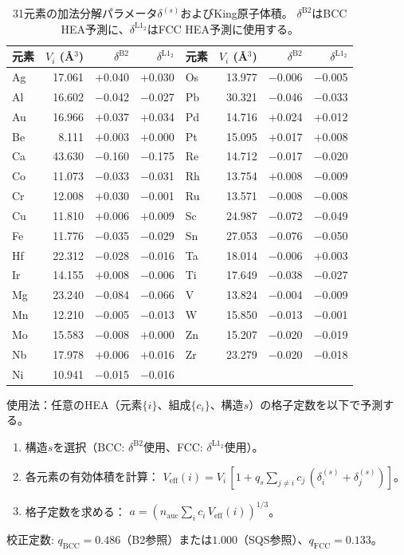 \documentclass[5p,10pt]{elsarticle}
\begin{document}
\begin{table}[!t]
\centering
\caption{31元素の加法分解パラメータ$\delta^{(s)}$およびKing原子体積。
$\delta^\text{B2}$はBCC HEA予測に、$\delta^{\text{L1}_2}$はFCC HEA予測に使用する。}
\label{tab:delta_params}
\footnotesize
\begin{tabular}{@{}lrrr|lrrr@{}}
\toprule
元素 & $V_i$ (\AA$^3$) & $\delta^\text{B2}$ & $\delta^{\text{L1}_2}$ &
元素 & $V_i$ (\AA$^3$) & $\delta^\text{B2}$ & $\delta^{\text{L1}_2}$ \\
\midrule
Ag &  17.061 & $+$0.040 & $+$0.030 & Os &  13.977 & $-$0.006 & $-$0.005 \\
Al &  16.602 & $-$0.042 & $-$0.027 & Pb &  30.321 & $-$0.046 & $-$0.033 \\
Au &  16.966 & $+$0.037 & $+$0.034 & Pd &  14.716 & $+$0.024 & $+$0.012 \\
Be &   8.111 & $+$0.003 & $+$0.000 & Pt &  15.095 & $+$0.017 & $+$0.008 \\
Ca &  43.630 & $-$0.160 & $-$0.175 & Re &  14.712 & $-$0.017 & $-$0.020 \\
Co &  11.073 & $-$0.033 & $-$0.031 & Rh &  13.754 & $+$0.008 & $-$0.009 \\
Cr &  12.008 & $+$0.030 & $-$0.001 & Ru &  13.571 & $-$0.008 & $-$0.008 \\
Cu &  11.810 & $+$0.006 & $+$0.009 & Sc &  24.987 & $-$0.072 & $-$0.049 \\
Fe &  11.776 & $-$0.035 & $-$0.029 & Sn &  27.053 & $-$0.076 & $-$0.050 \\
Hf &  22.312 & $-$0.028 & $-$0.016 & Ta &  18.014 & $-$0.006 & $+$0.003 \\
Ir &  14.155 & $+$0.008 & $-$0.006 & Ti &  17.649 & $-$0.038 & $-$0.027 \\
Mg &  23.240 & $-$0.084 & $-$0.066 & V  &  13.824 & $-$0.004 & $-$0.009 \\
Mn &  12.210 & $-$0.005 & $-$0.013 & W  &  15.850 & $-$0.013 & $-$0.001 \\
Mo &  15.583 & $-$0.008 & $+$0.000 & Zn &  15.207 & $-$0.020 & $-$0.019 \\
Nb &  17.978 & $+$0.006 & $+$0.016 & Zr &  23.279 & $-$0.020 & $-$0.018 \\
Ni &  10.941 & $-$0.015 & $-$0.016 &    &         &          &          \\
\bottomrule
\end{tabular}
\end{table}

\noindent
使用法：任意のHEA（元素$\{i\}$、組成$\{c_i\}$、構造$s$）の格子定数を以下で予測する。
\begin{enumerate}
  \item 構造$s$を選択（BCC: $\delta^\text{B2}$使用、FCC: $\delta^{\text{L1}_2}$使用）。
  \item 各元素の有効体積を計算：
    $V_\text{eff}(i) = V_i\,[1 + q_s \sum_{j \ne i} c_j\,(\delta_i^{(s)} + \delta_j^{(s)})]$。
  \item 格子定数を求める：
    $a = (n_\text{auc} \sum_i c_i\,V_\text{eff}(i))^{1/3}$。
\end{enumerate}
校正定数: $q_\text{BCC} = 0.486$（B2参照）または$1.000$（SQS参照）、$q_\text{FCC} = 0.133$。
\end{document}
